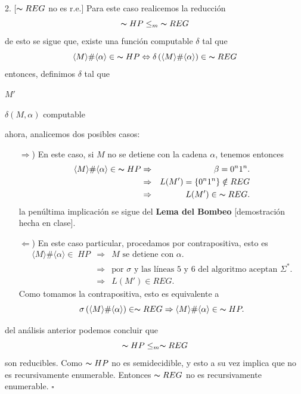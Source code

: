 \documentclass{article}
\begin{document}
2. [$\thicksim REG$ no es r.e.] Para este caso realicemos la reducción
\[
\thicksim HP \leq_{m}\; \thicksim REG
\]
de esto se sigue que, existe una función computable $\delta$ tal que
\[
\langle M \rangle \# \langle \alpha \rangle \in\; \thicksim HP
\Leftrightarrow \delta\left(\langle M \rangle \# \langle \alpha \rangle\right) \in\; \thicksim REG
\]
entonces, definimos $\delta$ tal que

\begin{algorithm}[H]
  \SetAlgorithmName{}{}%
  \DontPrintSemicolon

             {\Return $M'$\;}
             \caption{$\delta(M, \alpha)$ computable} \label{sigma}%
             \DecMargin{1em}
\end{algorithm}
ahora, analicemos dos posibles casos:
\begin{itemize}
\item[$\Rightarrow$)] En este caso, si $M$ no se detiene con la cadena $\alpha$, tenemos entonces
  \begin{eqnarray*}
    \langle M \rangle \# \langle \alpha \rangle \in\; \thicksim HP
    &\Rightarrow& \beta = 0^n1^n.\\
    &\Rightarrow& L(M') = \{0^n1^n\} \notin REG\\
    &\Rightarrow& L(M') \in\; \thicksim REG.
  \end{eqnarray*}
  la penúltima implicación se sigue del \textbf{Lema del Bombeo} [demostración hecha en clase].
\item[$\Leftarrow$)] En este caso particular, procedamos por contrapositiva, esto es
  \begin{eqnarray*}
    \langle M \rangle \# \langle \alpha \rangle \in\;  HP
    &\Rightarrow& M \text{ se detiene con } \alpha.\\
    &\Rightarrow& \text{por } \sigma \text{ y las líneas 5 y 6 del algoritmo aceptan } \Sigma^*.\\
    &\Rightarrow& L(M') \in REG.
  \end{eqnarray*}
  Como tomamos la contrapositiva, esto es equivalente a
  \[ \sigma\left(\langle M \rangle \# \langle \alpha \rangle\right) \in \thicksim REG
  \Rightarrow \langle M \rangle \# \langle \alpha \rangle \in\; \thicksim HP.\]
\end{itemize}
del análisis anterior podemos concluir que 
\[
\thicksim HP \leq_{m} \thicksim REG
\]
son reducibles. Como $\thicksim HP$ no es semidecidible, y esto a su vez implica que
no es recursivamente enumerable. Entonces $\thicksim REG$ no es recursivamente enumerable.
\hfill $\square$
\end{document}
